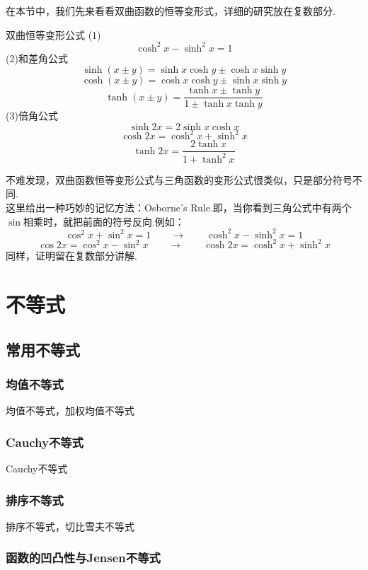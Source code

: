 \documentclass[lang=cn, zihao=5]{elegantbook}
\begin{document}
在本节中，我们先来看看双曲函数的恒等变形式，详细的研究放在复数部分.

\begin{proposition}{双曲恒等变形公式}
    (1)$$\cosh^2{x}-\sinh^2{x}=1$$
    (2)和差角公式
    $$\sinh{(x \pm y)}=\sinh{x}\cosh{y} \pm \cosh{x}\sinh{y}$$
    $$\cosh{(x \pm y)}=\cosh{x}\cosh{y} \pm \sinh{x}\sinh{y}$$
    $$\tanh{(x \pm y)}=\frac{\tanh{x} \pm \tanh{y}}{1 \pm \tanh{x}\tanh{y}}$$
    (3)倍角公式
    $$\sinh{2x}=2\sinh{x}\cosh{x}$$
    $$\cosh{2x}=\cosh^2{x}+\sinh^2{x}$$
    $$\tanh{2x}=\frac{2\tanh{x}}{1+\tanh^2{x}}$$
\end{proposition}
\begin{remark}
    不难发现，双曲函数恒等变形公式与三角函数的变形公式很类似，只是部分符号不同.\\
    这里给出一种巧妙的记忆方法：Osborne's Rule.即，当你看到三角公式中有两个$\sin$相乘时，就把前面的符号反向.例如：$$\cos^2{x}+\sin^2{x}=1 \qquad \longrightarrow \qquad \cosh^2{x}-\sinh^2{x}=1$$
    $$\cos{2x}=\cos^2{x}-\sin^2{x} \qquad \longrightarrow \qquad \cosh{2x}=\cosh^2{x}+\sinh^2{x}$$
    同样，证明留在复数部分讲解.
\end{remark}


\chapter{不等式}

\section{常用不等式}

\subsection{均值不等式}

均值不等式，加权均值不等式

\subsection{Cauchy不等式}

Cauchy不等式

\subsection{排序不等式}

排序不等式，切比雪夫不等式

\subsection{函数的凹凸性与Jensen不等式}
\end{document}
